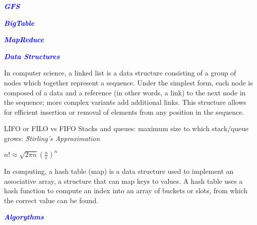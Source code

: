 \documentclass[9pt]{amsart}
\newcommand{\filldots}{\noindent \textbf {\textcolor {blue} {\dotfill}} }
\begin{document}
\begin{multicols}{2}
\filldots
 
\noindent \textbf {\textcolor {blue} {\em GFS}} 

\filldots
 
\noindent \textbf {\textcolor {blue} {\em BigTable}} 

\filldots 

\noindent \textbf {\textcolor {blue} {\em MapReduce}} 

\filldots 

\noindent \textbf {\textcolor {blue} {\em Data Structures}} 

\filldots 

\noindent {\textcolor {blue} {\em Linked Lists}} 
\noindent In computer science, a linked list is a data structure consisting of a group of nodes which together represent a sequence. Under the simplest form, each node is composed of a data and a reference (in other words, a link) to the next node in the sequence; more complex variants add additional links. This structure allows for efficient insertion or removal of elements from any position in the sequence.
\filldots 

\noindent {\textcolor {blue} {\em Binary Trees}} 

\filldots 

\noindent {\textcolor {blue} {\em Tries}} 

\filldots 

\noindent {\textcolor {blue} {\em Stacks \& Queues}} 

LIFO or FILO vs FIFO
Stacks and queues: maximum size to which stack/queue grows:
{\em {\u Stirling's Approximation}}

$n! \approx \sqrt{2 \pi n} (\frac {n}{e})^n$

\filldots 

\noindent {\textcolor {blue} {\em Vector/ArrayLists}} 

\filldots 

\noindent {\textcolor {blue} {\em Hash Tables}} 

\noindent In computing, a hash table (map) is a data structure used to implement an associative array, a structure that can map keys to values. A hash table uses a hash function to compute an index into an array of buckets or slots, from which the correct value can be found.

\filldots 

\noindent \textbf {\textcolor {blue} {\em Algorythms}} 
\noindent 
\filldots 

\noindent {\textcolor {blue} {\em Recursion}} 


\end{multicols}
\end{document}
